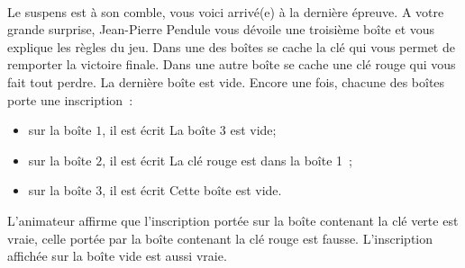 \documentclass[11pt,a4paper]{article}
\begin{document}
\begin{Exercise}[title = {Logique et calcul des propositions}, origin = {\bac \; {\sc ccinp 2018 - mp}}]
	\ExePart[name = {Troisième épreuve}]\\
	Le suspens est à son comble, vous voici arrivé(e) à la dernière épreuve.
	A votre grande surprise, Jean-Pierre Pendule vous dévoile une troisième boîte et vous explique les règles du jeu.
	Dans une des boîtes se cache la clé qui vous permet de remporter la victoire finale.
	Dans une autre boîte se cache une clé rouge qui vous fait tout perdre.
	La dernière boîte est vide.
	Encore une fois, chacune des boîtes porte une inscription~:
	\begin{itemize}
		\item sur la boîte $1$, il est écrit \og{}La boîte 3 est vide\fg{};
		\item  sur la boîte $2$, il est écrit \og{}La clé rouge est dans la boîte 1\fg{}~;
		\item  sur la boîte $3$, il est écrit \og{}Cette boîte est vide\fg{}.
	\end{itemize}
	L'animateur affirme que l'inscription portée sur la boîte contenant la clé verte est vraie, celle portée par la boîte contenant la clé rouge est fausse.
	L'inscription affichée sur la boîte vide est aussi vraie.
\end{Exercise}
\end{document}
